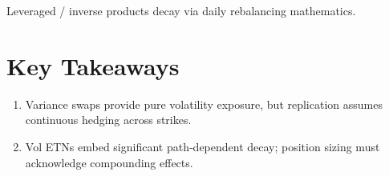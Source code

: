 Leveraged / inverse products decay via daily rebalancing mathematics.

\section*{Key Takeaways}
\begin{enumerate}
  \item Variance swaps provide pure volatility exposure, but replication
        assumes continuous hedging across strikes.
  \item Vol ETNs embed significant path‑dependent decay; position sizing
        must acknowledge compounding effects.
\end{enumerate}

